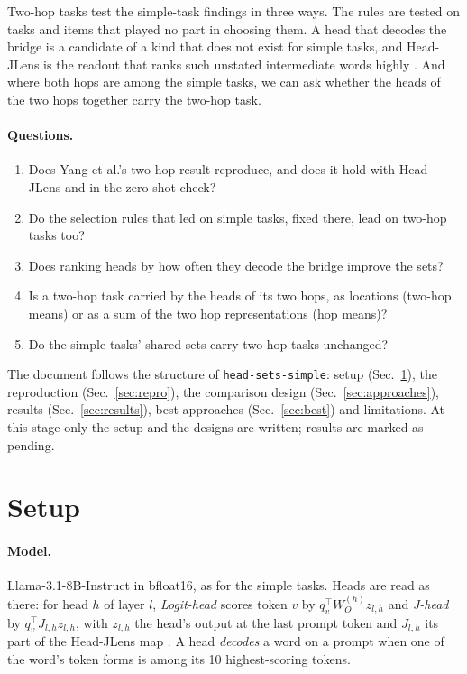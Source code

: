\documentclass[10pt,a4paper]{article}
\begin{document}
Two-hop tasks test the simple-task findings in three ways. The rules are tested on tasks and items that played no part in choosing them. A head that decodes the bridge is a candidate of a kind that does not exist for simple tasks, and Head-JLens is the readout that ranks such unstated intermediate words highly \citep[Sec.~3]{merlo2026headjlens}. And where both hops are among the simple tasks, we can ask whether the heads of the two hops together carry the two-hop task.

\paragraph{Questions.}
\begin{enumerate}
\item Does Yang et al.'s two-hop result reproduce, and does it hold with Head-JLens and in the zero-shot check?
\item Do the selection rules that led on simple tasks, fixed there, lead on two-hop tasks too?
\item Does ranking heads by how often they decode the bridge improve the sets?
\item Is a two-hop task carried by the heads of its two hops, as locations (two-hop means) or as a sum of the two hop representations (hop means)?
\item Do the simple tasks' shared sets carry two-hop tasks unchanged?
\end{enumerate}

The document follows the structure of \texttt{head-sets-simple}: setup (Sec.~\ref{sec:setup}), the reproduction (Sec.~\ref{sec:repro}), the comparison design (Sec.~\ref{sec:approaches}), results (Sec.~\ref{sec:results}), best approaches (Sec.~\ref{sec:best}) and limitations. At this stage only the setup and the designs are written; results are marked as pending.

\section{Setup}\label{sec:setup}

\paragraph{Model.} Llama-3.1-8B-Instruct in bfloat16, as for the simple tasks. Heads are read as there: for head $h$ of layer $l$, \emph{Logit-head} scores token $v$ by $q_v^\top W_O^{(h)} z_{l,h}$ and \emph{J-head} by $q_v^\top J_{l,h} z_{l,h}$, with $z_{l,h}$ the head's output at the last prompt token and $J_{l,h}$ its part of the Head-JLens map \citep{merlo2026headjlens}. A head \emph{decodes} a word on a prompt when one of the word's token forms is among its 10 highest-scoring tokens.
\end{document}
